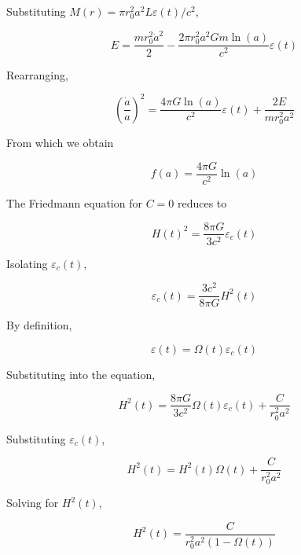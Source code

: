\documentclass[11pt]{article}
\begin{document}
\begin{pproblem}
\begin{pssolution*}{}{ }
\begin{alternativas}
        Substituting \(M(r) = \pi r_0^2 a^2 L \varepsilon(t)/c^2\),

        \[E = \frac{m r_0^2 \dot{a}^2}{2} - \frac{2\pi r_0^2 a^2 G m \ln(a)}{c^2} \varepsilon(t)\]

        Rearranging,

        \[\left(\frac{\dot{a}}{a}\right)^2 = \frac{4\pi G \ln(a)}{c^2} \varepsilon(t) + \frac{2E}{mr_0^2 a^2}\]

        From which we obtain

        \[\boxed{f(a) = \frac{4\pi G}{c^2} \ln(a)}\]

        \item The Friedmann equation for \(C = 0\) reduces to

        \[H(t)^2 = \frac{8\pi G}{3c^2} \varepsilon_c(t)\]

        Isolating \(\varepsilon_c(t)\),

        \[\boxed{\varepsilon_c(t) = \frac{3c^2}{8\pi G} H^2(t)}\]

        By definition,

        \[\varepsilon(t) = \Omega (t) \varepsilon_c(t)\]

        Substituting into the equation,

        \[H^2(t) = \frac{8\pi G}{3c^2} \Omega(t) \varepsilon_c(t) + \frac{C}{r_0^2 a^2}\]

        Substituting \(\varepsilon_c(t)\),

        \[H^2(t) = H^2(t) \Omega(t) + \frac{C}{r_0^2 a^2}\]

        Solving for \(H^2(t)\),

        \[\boxed{H^2(t) = \frac{C}{r_0^2 a^2 (1 - \Omega(t))}}\]
    \end{alternativas}
\end{pssolution*}
\end{pproblem}
\end{document}
